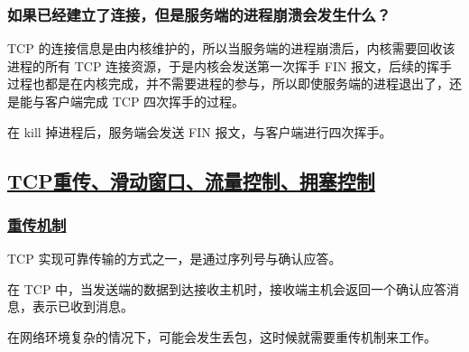 \documentclass[11pt]{article}
\begin{document}
\subsubsection{如果已经建立了连接，但是服务端的进程崩溃会发生什么？}
\label{sec:org933e928}
TCP 的连接信息是由内核维护的，所以当服务端的进程崩溃后，内核需要回收该进程的所有 TCP 连接资源，于是内核会发送第一次挥手 FIN 报文，后续的挥手过程也都是在内核完成，并不需要进程的参与，所以即使服务端的进程退出了，还是能与客户端完成 TCP 四次挥手的过程。

在 kill 掉进程后，服务端会发送 FIN 报文，与客户端进行四次挥手。

\subsection{\underline{TCP重传、滑动窗口、流量控制、拥塞控制}}
\label{sec:orgebf9b60}

\subsubsection{\underline{重传机制}}
\label{sec:org10ce1e3}

TCP 实现可靠传输的方式之一，是通过序列号与确认应答。

在 TCP 中，当发送端的数据到达接收主机时，接收端主机会返回一个确认应答消息，表示已收到消息。

在网络环境复杂的情况下，可能会发生丢包，这时候就需要重传机制来工作。
\end{document}
